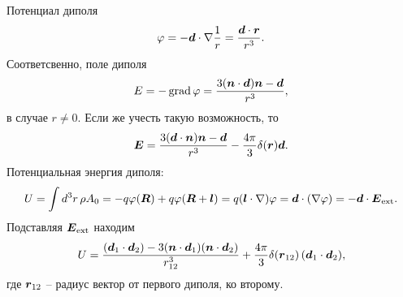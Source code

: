 
Потенциал диполя
\begin{equation*}
    \varphi = - \mbox{\boldmath $d$} \cdot \nabla \frac{1}{r} = \frac{\mbox{\boldmath $d$} \cdot \mbox{\boldmath $r$}}{r^3}.
\end{equation*}
Соответсвенно, поле диполя
\begin{equation*}
    E = - \mathop{\mathrm{grad}}\nolimits \varphi = \frac{3 (\mbox{\boldmath $n$} \cdot \mbox{\boldmath $d$}) \mbox{\boldmath $n$} - \mbox{\boldmath $d$}}{r^3},
\end{equation*}
в случае $r \neq 0$. Если же учесть такую возможность, то
\begin{equation*}
    \mbox{\boldmath $E$} = \frac{3 (\mbox{\boldmath $d$} \cdot \mbox{\boldmath $n$})\mbox{\boldmath $n$}-\mbox{\boldmath $d$}}{r^3} - \frac{4\pi}{3} \delta(\mbox{\boldmath $r$}) \mbox{\boldmath $d$}.
\end{equation*}
Потенциальная энергия диполя:
\begin{equation*}
    U = \int d^3 r\, \rho A_0 = - q \varphi(\mbox{\boldmath $R$}) + q \varphi(\mbox{\boldmath $R$}+\mbox{\boldmath $l$}) = q (\mbox{\boldmath $l$} \cdot \nabla)\varphi = \mbox{\boldmath $d$} \cdot (\nabla \varphi) = - \mbox{\boldmath $d$} \cdot {\mbox{\boldmath $E$}}_{\textnormal{ext}}.
\end{equation*}
Подставляя ${\mbox{\boldmath $E$}}_{\textnormal{ext}}$ находим
\begin{equation*}
    U = \frac{(\mbox{\boldmath $d$}_1 \cdot \mbox{\boldmath $d$}_2)-3(\mbox{\boldmath $n$} \cdot \mbox{\boldmath $d$}_1)(\mbox{\boldmath $n$} \cdot \mbox{\boldmath $d$}_2)}{r_{12}^{3}} + \frac{4\pi}{3} \delta(\mbox{\boldmath $r$}_{12}) \, (\mbox{\boldmath $d$}_1 \cdot \mbox{\boldmath $d$}_2),
\end{equation*}
где $\mbox{\boldmath $r$}_{12}$ -- радиус вектор от первого диполя, ко второму.

